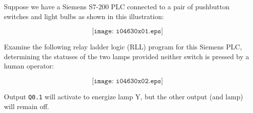 

Suppose we have a Siemens S7-200 PLC connected to a pair of pushbutton switches and light bulbs as shown in this illustration:

$$\texttt{[image: i04630x01.eps]}$$

Examine the following relay ladder logic (RLL) program for this Siemens PLC, determining the statuses of the two lamps provided neither switch is pressed by a human operator:

$$\texttt{[image: i04630x02.eps]}$$







Output {\tt Q0.1} will activate to energize lamp Y, but the other output (and lamp) will remain off. 











